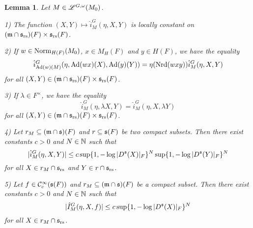 \documentclass[a4paper]{amsart}
\newcommand{\fm}{{\mathfrak{m}}} \newcommand{\fn}{{\mathfrak{n}}}\newcommand{\fo}{{\mathfrak{o}}} \newcommand{\fp}{{\mathfrak{p}}}
\newtheorem{lem}[thm]{Lemma}
\theoremstyle{definition}
\theoremstyle{remark}
\numberwithin{equation}{subsection}
\begin{document}
\begin{lem}\label{lemVI.3.1}
Let $M\in\mathscr{L}^{G, \omega}(M_0)$. 

1) The function $(X, Y)\mapsto\hat{i}_M^G(\eta, X, Y)$ is locally constant on $(\fm\cap\fs_\rs)(F)\times\fs_\rs(F)$. 

2) If $w\in{\mathrm{Norm}}_{H(F)}(M_0)$, $x\in M_H(F)$ and $y\in H(F)$, we have the equality
$$ \hat{i}_{{\mathrm{Ad}}(w)(M)}^G(\eta, {\mathrm{Ad}}(wx)(X), {\mathrm{Ad}}(y)(Y))=\eta({\mathrm{Nrd}}(wxy))\hat{i}_M^G(\eta, X, Y) $$
for all $(X, Y)\in(\fm\cap\fs_\rs)(F)\times\fs_\rs(F)$. 

3) If $\lambda\in F^\times$, we have the equality
$$ \hat{i}_M^G(\eta, \lambda X, Y)=\hat{i}_M^G(\eta, X, \lambda Y) $$
for all $(X, Y)\in(\fm\cap\fs_\rs)(F)\times\fs_\rs(F)$. 

4) Let $r_M\subseteq(\fm\cap\fs)(F)$ and $r\subseteq{\mathfrak{s}}(F)$ be two compact subsets. Then there exist constants $c>0$ and $N\in{\mathbb {N}}$ such that
$$ |\hat{i}_M^G(\eta, X, Y)|\leq c\sup\{1, -\log|D^{\mathfrak{s}}(X)|_F\}^N \sup\{1, -\log|D^{\mathfrak{s}}(Y)|_F\}^N $$
for all $X\in r_M\cap{\mathfrak{s}}_{\mathrm{rs}}$ and $Y\in r\cap{\mathfrak{s}}_{\mathrm{rs}}$. 

5) Let $f\in{\mathcal {C}}_c^\infty({\mathfrak{s}}(F))$ and $r_M\subseteq(\fm\cap\fs)(F)$ be a compact subset. Then there exist constants $c>0$ and $N\in{\mathbb {N}}$ such that
$$ |\hat{I}_M^G(\eta, X, f)|\leq c\sup\{1, -\log|D^{\mathfrak{s}}(X)|_F\}^N $$
for all $X\in r_M\cap{\mathfrak{s}}_{\mathrm{rs}}$. 
\end{lem}
\end{document}
